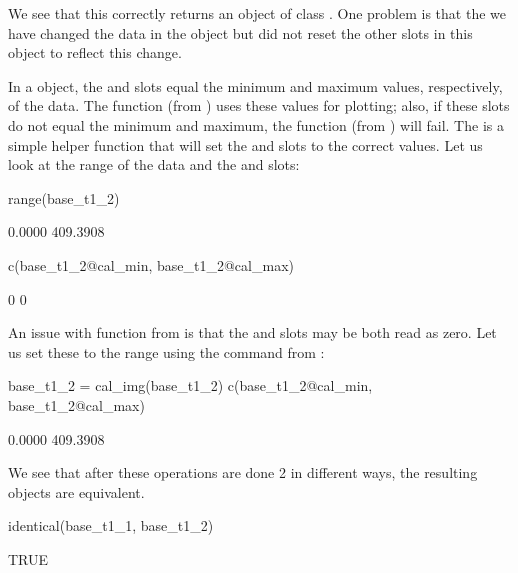 We see that this correctly returns an object of class .  One problem is that the we have changed the data in the  object   but did not reset the other slots in this object to reflect this change.


In a  object, the  and  slots equal the minimum and maximum values, respectively, of the data.   The  function (from ) uses these values for plotting; also, if these slots do not equal the minimum and maximum, the  function (from ) will fail.  The  is a simple helper function that will set the   and  slots to the correct values.  Let us look at the range of the data and the  and  slots:
\begin{Schunk}
\begin{Sinput}
range(base_t1_2)
\end{Sinput}
\begin{Soutput}
[1]   0.0000 409.3908
\end{Soutput}
\begin{Sinput}
c(base_t1_2@cal_min, base_t1_2@cal_max)
\end{Sinput}
\begin{Soutput}
[1] 0 0
\end{Soutput}
\end{Schunk}
An issue with  function from  is that the  and  slots may be both read as zero.  Let us set these to the range using the  command from :
\begin{Schunk}
\begin{Sinput}
base_t1_2 = cal_img(base_t1_2)
c(base_t1_2@cal_min, base_t1_2@cal_max)
\end{Sinput}
\begin{Soutput}
[1]   0.0000 409.3908
\end{Soutput}
\end{Schunk}
We see that after these operations are done 2 in different ways, the resulting  objects are equivalent.  
\begin{Schunk}
\begin{Sinput}
identical(base_t1_1, base_t1_2)
\end{Sinput}
\begin{Soutput}
[1] TRUE
\end{Soutput}
\end{Schunk}

